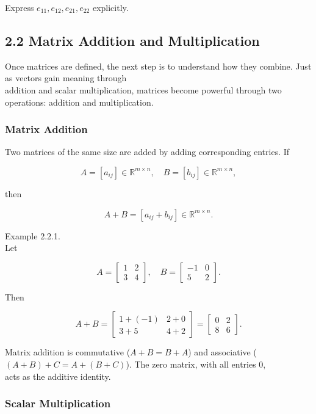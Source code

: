 \documentclass[
  12pt,
  a4paper,
]{article}
\begin{document}
Express \(e_{11}, e_{12}, e_{21}, e_{22}\) explicitly.

\subsection{2.2 Matrix Addition and
Multiplication}\label{22-matrix-addition-and-multiplication}

Once matrices are defined, the next step is to understand how they
combine. Just as vectors gain meaning through\\
addition and scalar multiplication, matrices become powerful through two
operations: addition and multiplication.

\subsubsection{Matrix Addition}\label{matrix-addition}

Two matrices of the same size are added by adding corresponding entries.
If

\[A = [a_{ij}] \in \mathbb{R}^{m \times n}, \quad
B = [b_{ij}] \in \mathbb{R}^{m \times n},\]

then

\[A + B = [a_{ij} + b_{ij}] \in \mathbb{R}^{m \times n}.\]

Example 2.2.1.\\
Let

\[A = \begin{bmatrix}
1 & 2 \\
3 & 4
\end{bmatrix}, \quad
B = \begin{bmatrix}
-1 & 0 \\
5 & 2
\end{bmatrix}.\]

Then

\[A + B = \begin{bmatrix}
1 + (-1) & 2 + 0 \\
3 + 5 & 4 + 2
\end{bmatrix} =
\begin{bmatrix}
0 & 2 \\
8 & 6
\end{bmatrix}.\]

Matrix addition is commutative (\(A+B = B+A\)) and associative
(\((A+B)+C = A+(B+C)\)). The zero matrix, with all entries 0,\\
acts as the additive identity.

\subsubsection{Scalar Multiplication}\label{scalar-multiplication-2}
\end{document}
